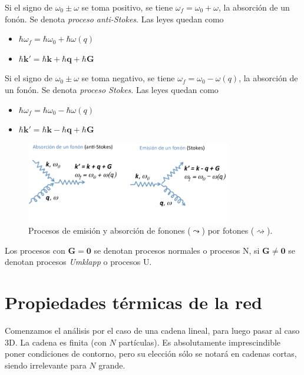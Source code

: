 Si el signo de $\omega_0 \pm \omega$ se toma positivo, se tiene
$\omega_f = \omega_0 + \omega$, la absorción de un fonón. Se denota
\emph{proceso anti-Stokes}. Las leyes quedan como
\begin{itemize}
\item $\hbar \omega_f =
\hbar \omega_0 + \hbar \omega(q)$
\item $\hbar \mathbf{k'} = \hbar
\mathbf{k} + \hbar \mathbf{q} + \hbar \mathbf{G}$
\end{itemize}

Si el signo de $\omega_0 \pm \omega$ se toma negativo, se tiene
$\omega_f = \omega_0 - \omega(q)$, la absorción de un fonón. Se denota
\emph{proceso Stokes}. Las leyes quedan como
\begin{itemize}
\item $\hbar \omega_f =
\hbar \omega_0 - \hbar \omega(q)$
\item $\hbar \mathbf{k'} = \hbar
\mathbf{k} - \hbar \mathbf{q} + \hbar \mathbf{G}$
\end{itemize}

\begin{figure}
  \centering
  \includegraphics[width=0.8\textwidth]{figures/stokes.png}
  \caption{Procesos de emisión y absorción de fonones ($\leadsto$) por fotones ($\rightsquigarrow$).}
  \label{fig:stokes}
\end{figure}



Los procesos con $\mathbf{G} = \mathbf{0}$ se denotan procesos
normales o procesos N, si $\mathbf{G} \neq \mathbf{0}$ se denotan
procesos \emph{Umklapp} o procesos U.




\chapter{Propiedades térmicas de la red}

Comenzamos el análisis por el caso de una cadena lineal, para luego
pasar al caso 3D. La cadena es finita (con $N$ partículas). Es
absolutamente imprescindible poner condiciones de contorno, pero su
elección sólo se notará en cadenas cortas, siendo irrelevante para $N$ grande.

